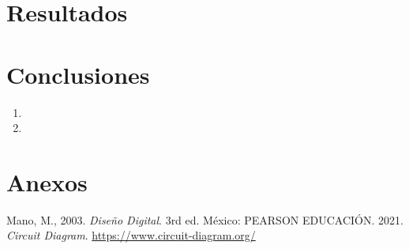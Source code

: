 \documentclass[conference]{IEEEtran}
\begin{document}
\section{Resultados}
    
\section{Conclusiones}
\begin{enumerate}
    \item 
    \item 
\end{enumerate}

\section{Anexos}
    
    
    
    
\begin{thebibliography}{00}
 Mano, M., 2003. \textit{Diseño Digital}. 3rd ed. México: PEARSON EDUCACIÓN.
 2021. \textit{Circuit Diagram}. \url{https://www.circuit-diagram.org/}
\end{thebibliography}
\end{document}
